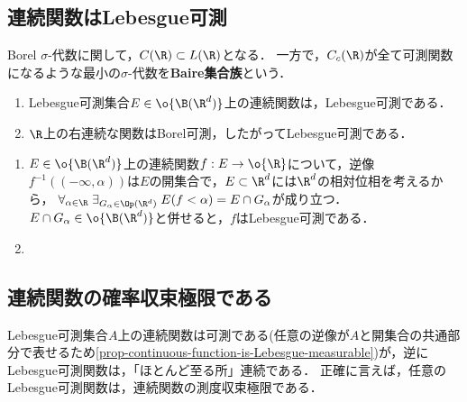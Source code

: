 \documentclass[uplatex, dvipdfmx]{jsreport}
\begin{document}
\subsection{連続関数はLebesgue可測}

\begin{tcolorbox}[colframe=ForestGreen, colback=ForestGreen!10!white,breakable,colbacktitle=ForestGreen!40!white,coltitle=black,fonttitle=\bfseries\sffamily,
title=]
    Borel $\sigma$-代数に関して，$C(\R)\subset L(\R)$となる．
    一方で，$C_c(\R)$が全て可測関数になるような最小の$\sigma$-代数を\textbf{Baire集合族}という．
\end{tcolorbox}

\begin{proposition}[Lebesgue可測関数と位相]\label{prop-continuous-function-is-Lebesgue-measurable}\mbox{}
    \begin{enumerate}
        \item Lebesgue可測集合$E\in\o{\B(\R^d)}$上の連続関数は，Lebesgue可測である．
        \item $\R$上の右連続な関数はBorel可測，したがってLebesgue可測である．
    \end{enumerate}
\end{proposition}
\begin{Proof}\mbox{}
    \begin{enumerate}
        \item $E\in\o{\B(\R^d)}$上の連続関数$f:E\to\o{\R}$について，逆像$f^{-1}((-\infty,\alpha))$は$E$の開集合で，$E\subset\R^d$には$\R^d$の相対位相を考えるから，
        $\forall_{\alpha\in\R}\;\exists_{G_\alpha\in\Op(\R^d)}\;E(f<\alpha)=E\cap G_\alpha$が成り立つ．
        $E\cap G_\alpha\in\o{\B(\R^d)}$と併せると，$f$はLebesgue可測である．
        \item 

    \end{enumerate}
\end{Proof}

\subsection{連続関数の確率収束極限である}


\begin{tcolorbox}[colframe=ForestGreen, colback=ForestGreen!10!white,breakable,colbacktitle=ForestGreen!40!white,coltitle=black,fonttitle=\bfseries\sffamily,
    title=]
    Lebesgue可測集合$A$上の連続関数は可測である(任意の逆像が$A$と開集合の共通部分で表せるため\ref{prop-continuous-function-is-Lebesgue-measurable})が，逆にLebesgue可測関数は，「ほとんど至る所」連続である．
    正確に言えば，任意のLebesgue可測関数は，連続関数の測度収束極限である．
\end{tcolorbox}
    
\end{document}
